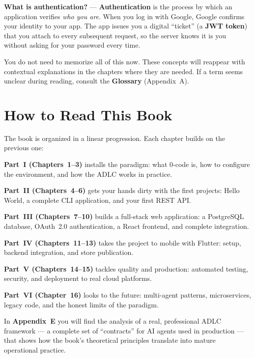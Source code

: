 \begin{notebox}
\textbf{What is authentication?} --- \textbf{Authentication} is the process by which an application verifies \textit{who you are}. When you log in with Google, Google confirms your identity to your app. The app issues you a digital ``ticket'' (a \textbf{JWT token}) that you attach to every subsequent request, so the server knows it is you without asking for your password every time.
\end{notebox}

You do not need to memorize all of this now. These concepts will reappear with contextual explanations in the chapters where they are needed. If a term seems unclear during reading, consult the \textbf{Glossary} (Appendix~A).

\section*{How to Read This Book}

The book is organized in a linear progression. Each chapter builds on the previous one:

\textbf{Part~I (Chapters~1--3)} installs the paradigm: what 0-code is, how to configure the environment, and how the ADLC works in practice.

\textbf{Part~II (Chapters~4--6)} gets your hands dirty with the first projects: Hello World, a complete CLI application, and your first REST API.

\textbf{Part~III (Chapters~7--10)} builds a full-stack web application: a PostgreSQL database, OAuth~2.0 authentication, a React frontend, and complete integration.

\textbf{Part~IV (Chapters~11--13)} takes the project to mobile with Flutter: setup, backend integration, and store publication.

\textbf{Part~V (Chapters~14--15)} tackles quality and production: automated testing, security, and deployment to real cloud platforms.

\textbf{Part~VI (Chapter~16)} looks to the future: multi-agent patterns, microservices, legacy code, and the honest limits of the paradigm.

In \textbf{Appendix~E} you will find the analysis of a real, professional ADLC framework --- a complete set of ``contracts'' for AI agents used in production --- that shows how the book's theoretical principles translate into mature operational practice.

